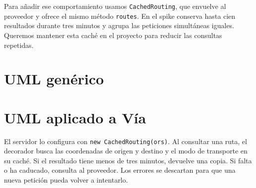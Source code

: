 \documentclass[10pt,a4paper]{article}
\newcommand{\apartado}[1]{\section*{\large #1}}
\begin{document}
Para añadir ese comportamiento usamos \texttt{CachedRouting}, que envuelve al proveedor y ofrece el mismo método \texttt{routes}. En el spike conserva hasta cien resultados durante tres minutos y agrupa las peticiones simultáneas iguales. Queremos mantener esta caché en el proyecto para reducir las consultas repetidas.

\apartado{UML genérico}
\begin{center}\end{center}

\apartado{UML aplicado a Vía}
\begin{center}\end{center}

El servidor lo configura con \texttt{new CachedRouting(ors)}. Al consultar una ruta, el decorador busca las coordenadas de origen y destino y el modo de transporte en su caché. Si el resultado tiene menos de tres minutos, devuelve una copia. Si falta o ha caducado, consulta al proveedor. Los errores se descartan para que una nueva petición pueda volver a intentarlo.
\end{document}
